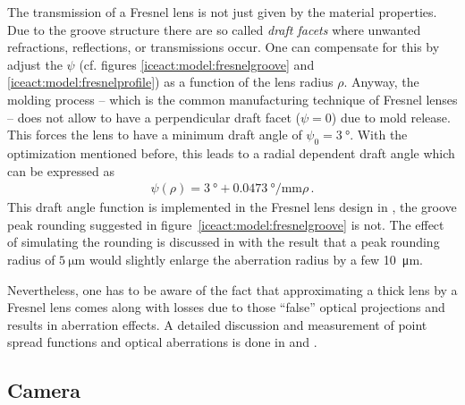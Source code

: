 The transmission of a Fresnel lens is not just given by the material properties. Due to the groove structure there are so called \textit{draft facets} where unwanted refractions, reflections, or transmissions occur. One can compensate for this by adjust the  $\psi$ (cf. figures \ref{iceact:model:fresnelgroove} and \ref{iceact:model:fresnelprofile}) as a function of the lens radius $\rho$. Anyway, the molding process -- which is the common manufacturing technique of Fresnel lenses -- does not allow to have a perpendicular draft facet ($\psi = 0$) due to mold release. This forces the lens to have a minimum draft angle of $\psi_0 = \SI{3}{\degree}$. With the optimization mentioned before, this leads to a radial dependent draft angle which can be expressed as \cite{famous:eichler, famous:niggemann}
\begin{align}
	\psi(\rho) = \SI{3}{\degree} + \SI{0.0473}{\degree\per\milli\meter}\rho\,.
\end{align}
This draft angle function is implemented in the Fresnel lens design in \geant, the groove peak rounding suggested in figure~\ref{iceact:model:fresnelgroove} is not. The effect of simulating the rounding is discussed in \cite{famous:eichler} with the result that a peak rounding radius of $\SI{5}{\micro\meter}$ would slightly enlarge the aberration radius by a few \SI{10}{\micro\meter}.

Nevertheless, one has to be aware of the fact that approximating a thick lens by a Fresnel lens comes along with losses due to those \enquote{false} optical projections and results in aberration effects. A detailed discussion and measurement of point spread functions and optical aberrations is done in \cite{famous:niggemann} and \cite{famous:eichler}.

\subsection{Camera}\label{iceact:model:camera}

